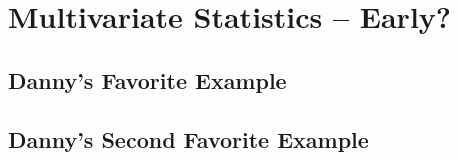 \chapter{Multivariate Statistics -- Early?}




\section{Danny's Favorite Example}

\section{Danny's Second Favorite Example}
